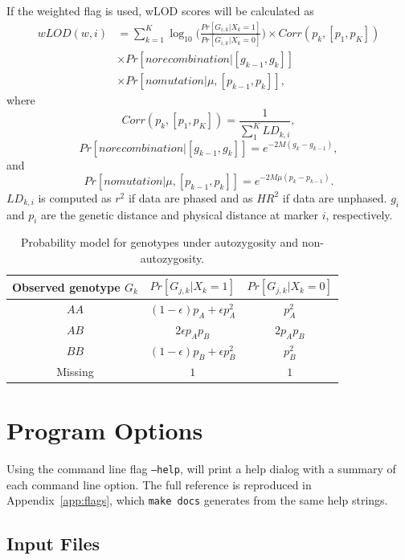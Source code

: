 \documentclass[12pt]{article}%
\begin{document}
If the weighted flag is used, wLOD scores will be calculated as
\begin{align}
wLOD(w,i) &= \sum_{k=1}^K \log_{10}\Big(\frac{Pr[G_{i,k} | X_k = 1]}{Pr[G_{i,k} |X_k=0]}\Big)\times Corr(p_k,[p_1,p_K]) \\ 
&\times Pr[norecombination|[g_{k-1},g_{k}]] \\ 
&\times Pr[nomutation|\mu,[p_{k-1},p_k]],
\end{align}
where
\begin{equation}
Corr(p_k,[p_1,p_K]) = \frac{1}{\sum_1^KLD_{k,i}},
\end{equation}
\begin{equation}
Pr[norecombination|[g_{k-1},g_{k}]] = e^{-2M(g_k-g_{k-1})},
\end{equation}
and
\begin{equation}
Pr[nomutation|\mu,[p_{k-1},p_k]] = e^{-2M\mu(p_k-p_{k-1})}.
\end{equation}
$LD_{k,i}$ is computed as $r^2$ if data are phased and as $HR^2$ if data are unphased. $g_i$ and $p_i$ are the genetic distance and physical distance at marker $i$, respectively.


\begin{table}[h]
\centering
\caption{ Probability model for genotypes under autozygosity and non-autozygosity. }
\begin{tabular}{|c|cc|}
\hline
Observed genotype $G_k$ & $Pr[G_{j,k}|X_k=1]$ & $Pr[G_{j,k}|X_k=0]$\\
\hline
$AA$ & $(1-\epsilon)p_A+\epsilon p_A^2$ & $p_A^2$\\
$AB$ & $2\epsilon p_Ap_B$ & $2p_Ap_B$\\
$BB$ & $(1-\epsilon)p_B+\epsilon p_B^2$ & $p_B^2$\\
Missing & $1$ & $1$\\
\hline
\end{tabular}
\end{table}

\section{Program Options}

Using the command line flag {\tt --help}, will print a help dialog with a summary of each command line option.  The full reference is reproduced in Appendix~\ref{app:flags}, which {\tt make docs} generates from the same help strings.

\subsection{Input Files}
\end{document}
